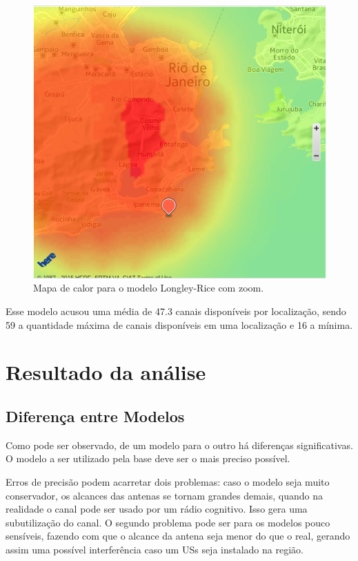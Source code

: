 \begin{figure}[htb]
\centering
\includegraphics[width=1.0\textwidth]{figs/longleyricein}
\caption[Mapa de calor para o modelo Longley-Rice com zoom.]
{Mapa de calor para o modelo Longley-Rice com zoom.}
\label{fig:longleyricein}
\end{figure} 

\FloatBarrier

Esse modelo acusou uma média de 47.3 canais disponíveis por localização, sendo 59 a quantidade máxima de canais disponíveis em uma localização e 16 a mínima.

\section{Resultado da análise}

\subsection{Diferença entre Modelos}

Como pode ser observado, de um modelo para o outro há diferenças significativas. O modelo a ser utilizado pela base deve ser o mais preciso possível.

Erros de precisão podem acarretar dois problemas: caso o modelo seja muito conservador, os alcances das antenas se tornam grandes demais, quando na realidade o canal pode ser usado por um rádio cognitivo. Isso gera uma subutilização do canal. O segundo problema pode ser para os modelos pouco sensíveis, fazendo com que o alcance da antena seja menor do que o real, gerando assim uma possível interferência caso um USs seja instalado na região.

